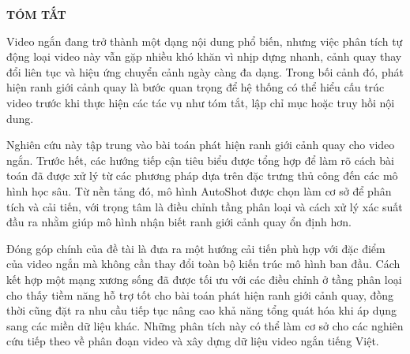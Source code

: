 {}

\begin{center}
{\large\bfseries{TÓM TẮT}}
\end{center}

\medskip

\indent Video ngắn đang trở thành một dạng nội dung phổ biến, nhưng việc phân tích tự động loại video này vẫn gặp nhiều khó khăn vì nhịp dựng nhanh, cảnh quay thay đổi liên tục và hiệu ứng chuyển cảnh ngày càng đa dạng. Trong bối cảnh đó, phát hiện ranh giới cảnh quay là bước quan trọng để hệ thống có thể hiểu cấu trúc video trước khi thực hiện các tác vụ như tóm tắt, lập chỉ mục hoặc truy hồi nội dung.

\indent Nghiên cứu này tập trung vào bài toán phát hiện ranh giới cảnh quay cho video ngắn. Trước hết, các hướng tiếp cận tiêu biểu được tổng hợp để làm rõ cách bài toán đã được xử lý từ các phương pháp dựa trên đặc trưng thủ công đến các mô hình học sâu. Từ nền tảng đó, mô hình AutoShot được chọn làm cơ sở để phân tích và cải tiến, với trọng tâm là điều chỉnh tầng phân loại và cách xử lý xác suất đầu ra nhằm giúp mô hình nhận biết ranh giới cảnh quay ổn định hơn.

\indent Đóng góp chính của đề tài là đưa ra một hướng cải tiến phù hợp với đặc điểm của video ngắn mà không cần thay đổi toàn bộ kiến trúc mô hình ban đầu. Cách kết hợp một mạng xương sống đã được tối ưu với các điều chỉnh ở tầng phân loại cho thấy tiềm năng hỗ trợ tốt cho bài toán phát hiện ranh giới cảnh quay, đồng thời cũng đặt ra nhu cầu tiếp tục nâng cao khả năng tổng quát hóa khi áp dụng sang các miền dữ liệu khác. Những phân tích này có thể làm cơ sở cho các nghiên cứu tiếp theo về phân đoạn video và xây dựng dữ liệu video ngắn tiếng Việt.
